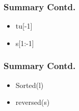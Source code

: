 \documentclass[presentation]{beamer}
\begin{document}
\begin{frame}
\frametitle{Summary Contd.}
\label{sec-9}
\begin{itemize}

\item tu[-1]\\
\label{sec-9.1}%
\item s[1:-1]\\
\label{sec-9.2}%
\end{itemize} %
\end{frame}
\begin{frame}
\frametitle{Summary Contd.}
\label{sec-10}
\begin{itemize}

\item Sorted(l)\\
\label{sec-10.1}%
\item reversed(s)\\
\label{sec-10.2}%
\end{itemize} %
\end{frame}
\end{document}

